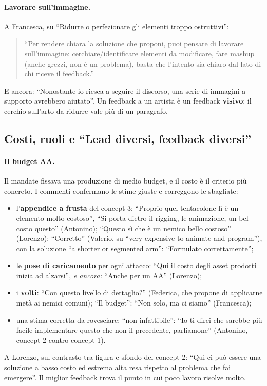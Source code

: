 \paragraph{Lavorare sull'immagine.} A Francesca, su ``Ridurre o perfezionare
gli elementi troppo ostruttivi'':
\begin{quote}
  ``Per rendere chiara la soluzione che proponi, puoi pensare di lavorare
  sull'immagine: cerchiare/\allowbreak identificare elementi da modificare, fare mashup
  (anche grezzi, non è un problema), basta che l'intento sia chiaro dal lato
  di chi riceve il feedback.''
\end{quote}
E ancora: ``Nonostante io riesca a seguire il discorso, una serie di immagini
a supporto avrebbero aiutato''. Un feedback a un artista è un feedback
\textbf{visivo}: il cerchio sull'arto da ridurre vale più di un paragrafo.

\subsection{Costi, ruoli e ``Lead diversi, feedback diversi''}
\label{rv:t6:sec:lead}

\paragraph{Il budget AA.} Il mandate fissava una produzione di medio budget,
e il costo è il criterio più concreto. I commenti confermano le stime giuste e
correggono le sbagliate:
\begin{itemize}
  \item l'\textbf{appendice a frusta} del concept 3: ``Proprio quel tentacolone
        lì è un elemento molto costoso'', ``Si porta dietro il rigging, le
        animazione, un bel costo questo'' (Antonino); ``Questo sì che è un
        nemico bello costoso'' (Lorenzo); ``Corretto'' (Valerio, su ``very
        expensive to animate and program''), con la soluzione ``a shorter or
        segmented arm'': ``Formulato correttamente'';
  \item le \textbf{pose di caricamento} per ogni attacco: ``Qui il costo degli
        asset prodotti inizia ad alzarsi'', \emph{e ancora:} ``Anche per un
        AA'' (Lorenzo);
  \item i \textbf{volti}: ``Con questo livello di dettaglio?'' (Federica, che
        propone di applicarne metà ai nemici comuni); ``Il budget'': ``Non
        solo, ma ci siamo'' (Francesca);
  \item una stima corretta da rovesciare: ``non infattibile'': ``Io ti direi
        che sarebbe più facile implementare questo che non il precedente,
        parliamone'' (Antonino, concept 2 contro concept 1).
\end{itemize}
A Lorenzo, sul contrasto tra figura e sfondo del concept 2: ``Qui ci può
essere una soluzione a basso costo ed estrema alta resa rispetto al problema
che fai emergere''. Il miglior feedback trova il punto in cui poco lavoro
risolve molto.

